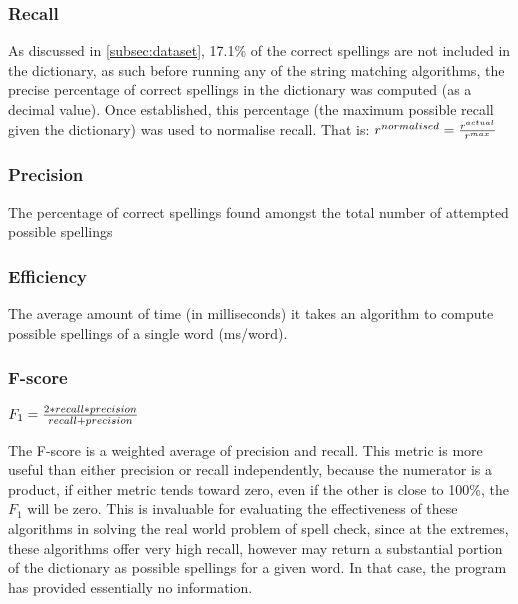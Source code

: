 \documentclass[twocolumn]{article}
\begin{document}
            \subsubsection{Recall}
    As discussed in \ref{subsec:dataset}, 17.1\% of the correct spellings are not included in the dictionary, as such
    before running any of the string matching algorithms, the precise percentage of correct spellings in the dictionary
    was computed (as a decimal value).
    Once established, this percentage (the maximum possible recall given the dictionary) was used to normalise recall.
    That is:
    $r^{normalised} = \frac{r^{actual}}{r^{max}}\\$


            \subsubsection{Precision}
    The percentage of correct spellings found amongst the total number of attempted possible spellings



            \subsubsection{Efficiency}
    The average amount of time (in milliseconds) it takes an algorithm to compute possible spellings of a single word
    (ms/word).

            \subsubsection{F-score} \label{F}
            $F_1 = \frac{2*recall*precision}{recall+precision}\\$

    The F-score is a weighted average of precision and recall\autocite{FSCORE}.
    This metric is more useful than either precision or recall independently, because the numerator is a product, if
    either metric tends toward zero, even if the other is close to 100\%, the $F_1$ will be zero.
    This is invaluable for evaluating the effectiveness of these algorithms in solving the real world problem of spell
    check, since at the extremes, these algorithms offer very high recall, however may return a substantial portion of the
    dictionary as possible spellings for a given word.
    In that case, the program has provided essentially no information.
\end{document}
